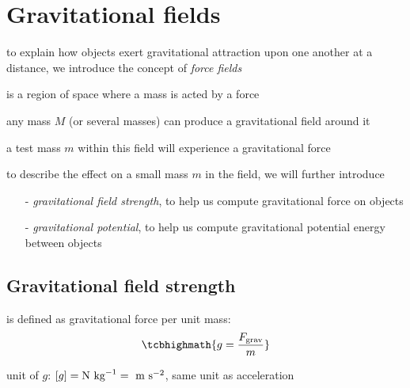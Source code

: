 


\section{Gravitational fields}

to explain how objects exert gravitational attraction upon one another at a distance, we introduce the concept of \emph{force fields}

\begin{ilight}
	 is a region of space where a mass is acted by a force
\end{ilight}

any mass $M$ (or several masses) can produce a gravitational field around it

a test mass $m$ within this field will experience a gravitational force

\vspace*{\baselineskip}

to describe the effect on a small mass $m$ in the field, we will further introduce
\begin{itemize}
	\item[-] \emph{gravitational field strength}, to help us compute gravitational force on objects
	
	\item[-] \emph{gravitational potential}, to help us compute gravitational potential energy between objects
\end{itemize}


\subsection{Gravitational field strength}

\rcyskip

\begin{ilight}
	 is defined as gravitational force per unit mass: $$\tcbhighmath{g=\frac{F_\text{grav}}{m}}$$
\end{ilight}

\cmt unit of $g$: $[g]=\text{N kg}^{-1} = \text{ m s$^{-2}$}$, same unit as acceleration

